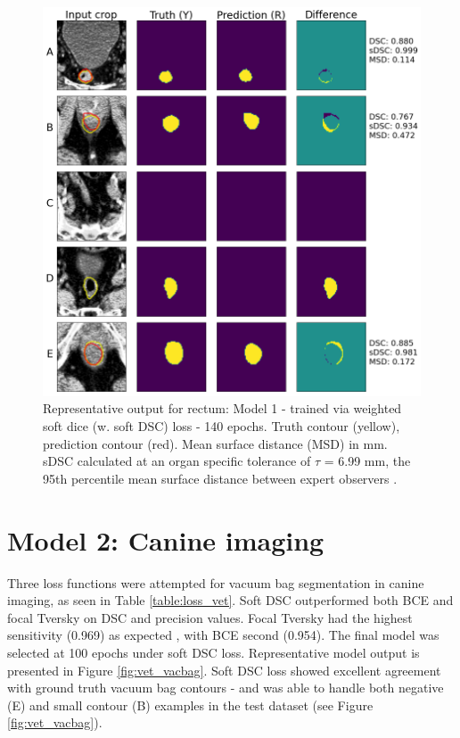 \begin{figure}[H]
	\begin{center}
		\includegraphics[width=1.0\textwidth]{figures/prostate_rectum}
		\caption{Representative output for rectum: Model 1 - trained via weighted soft dice (w. soft DSC) loss - 140 epochs. Truth contour (yellow), prediction contour (red). Mean surface distance (MSD) in mm. sDSC \cite{Nikolov_2018} calculated at an organ specific tolerance of $\tau$ = 6.99 mm, the 95th percentile mean surface distance between expert observers \cite{Roach_2019}.}
		\label{fig:prostate_rectum}
	\end{center}
\end{figure}

\section{Model 2: Canine imaging}

Three loss functions were attempted for vacuum bag segmentation in canine imaging, as seen in Table \ref{table:loss_vet}. Soft DSC outperformed both BCE and focal Tversky on DSC and precision values. Focal Tversky had the highest sensitivity (0.969) as expected \cite{Khan2019}, with BCE second (0.954). The final model was selected at 100 epochs under soft DSC loss. Representative model output is presented in Figure \ref{fig:vet_vacbag}. Soft DSC loss showed excellent agreement with ground truth vacuum bag contours - and was able to handle both negative (E) and small contour (B) examples in the test dataset (see Figure \ref{fig:vet_vacbag}).

